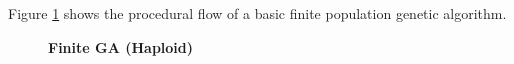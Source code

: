 Figure \ref{FiniteGA} shows the procedural flow of a basic finite population genetic algorithm.
\begin{figure}[h]
\begin{center}
\hspace{4pt}
\caption{\textbf{Finite GA (Haploid)} }
\label{FiniteGA}
\end{center}
\end{figure}

